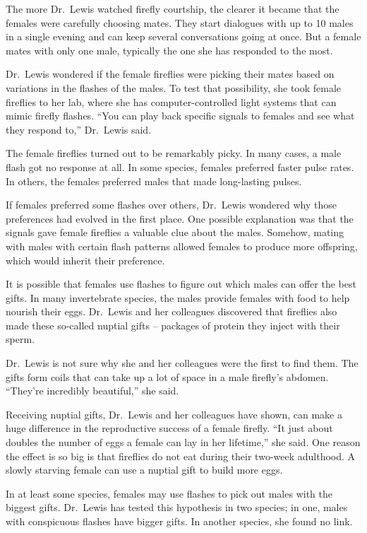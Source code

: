 ﻿\documentclass[12pt]{article}
\begin{document}
The more Dr.~Lewis watched firefly courtship, the clearer it became that the females were carefully
choosing mates. They start dialogues with up to 10 males in a single evening and can keep several
conversations going at once. But a female mates with only one male, typically the one she has
responded to the most.

Dr.~Lewis wondered if the female fireflies were picking their mates based on variations in the
flashes of the males. To test that possibility, she took female fireflies to her lab, where she has
computer-controlled light systems that can mimic firefly flashes. ``You can play back specific
signals to females and see what they respond to,'' Dr.~Lewis said.

The female fireflies turned out to be remarkably picky. In many cases, a male flash got no response
at all. In some species, females preferred faster pulse rates. In others, the females preferred
males that made long-lasting pulses.

If females preferred some flashes over others, Dr.~Lewis wondered why those preferences had evolved
in the first place. One possible explanation was that the signals gave female fireflies a valuable
clue about the males. Somehow, mating with males with certain flash patterns allowed females to
produce more offspring, which would inherit their preference.

It is possible that females use flashes to figure out which males can offer the best gifts. In many
invertebrate species, the males provide females with food to help nourish their eggs. Dr.~Lewis and
her colleagues discovered that fireflies also made these so-called nuptial gifts -- packages of
protein they inject with their sperm.

Dr.~Lewis is not sure why she and her colleagues were the first to find them. The gifts form coils
that can take up a lot of space in a male firefly's abdomen. ``They're incredibly beautiful,'' she
said.

Receiving nuptial gifts, Dr.~Lewis and her colleagues have shown, can make a huge difference in the
reproductive success of a female firefly. ``It just about doubles the number of eggs a female can
lay in her lifetime,'' she said. One reason the effect is so big is that fireflies do not eat during
their two-week adulthood. A slowly starving female can use a nuptial gift to build more eggs.

In at least some species, females may use flashes to pick out males with the biggest gifts.
Dr.~Lewis has tested this hypothesis in two species; in one, males with conspicuous flashes have
bigger gifts. In another species, she found no link.
\end{document}
